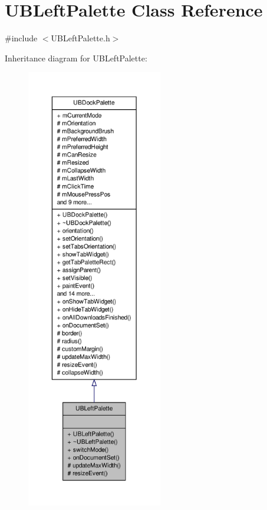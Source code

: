 \hypertarget{class_u_b_left_palette}{\section{U\-B\-Left\-Palette Class Reference}
\label{de/d4d/class_u_b_left_palette}
}


{\ttfamily \#include $<$U\-B\-Left\-Palette.\-h$>$}



Inheritance diagram for U\-B\-Left\-Palette\-:
\nopagebreak
\begin{figure}[H]
\begin{center}
\leavevmode
\includegraphics[height=550pt]{d0/de2/class_u_b_left_palette__inherit__graph}
\end{center}
\end{figure}


